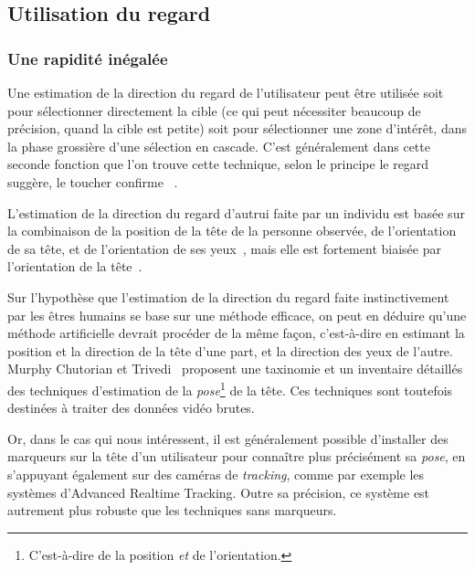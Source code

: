 	\subsection{Utilisation du regard}
	\subsubsection{Une rapidité inégalée}
	Une estimation de la direction du regard de l'utilisateur peut être utilisée soit pour sélectionner directement la cible (ce qui peut nécessiter beaucoup de précision, quand la cible est petite) soit pour sélectionner une zone d'intérêt, dans la phase grossière d'une sélection en cascade. C'est généralement dans cette seconde fonction que l'on trouve cette technique, selon le principe \og le regard suggère, le toucher confirme \fg{}~\cite{stellmach2012look}.

	L'estimation de la direction du regard d'autrui faite par un individu est basée sur la combinaison de la position de la tête de la personne observée, de l'orientation de sa tête, et de l'orientation de ses yeux~\cite{langton2004influence}, mais elle est fortement biaisée par l'orientation de la tête~\cite{wollaston1824apparent}.
	
	Sur l'hypothèse que l'estimation de la direction du regard faite instinctivement par les êtres humains se base sur une méthode efficace, on peut en déduire qu'une méthode artificielle devrait procéder de la même façon, c'est-à-dire en estimant la position et la direction de la tête d'une part, et la direction des yeux de l'autre. Murphy Chutorian et Trivedi~\cite{murphy2009head} proposent une taxinomie et un inventaire détaillés des techniques d'estimation de la \emph{pose}\footnote{C'est-à-dire de la position \emph{et} de l'orientation.} de la tête. Ces techniques sont toutefois destinées à traiter des données vidéo brutes.
	
	Or, dans le cas qui nous intéressent, il est généralement possible d'installer des marqueurs sur la tête d'un utilisateur pour connaître plus précisément sa \emph{pose}, en s'appuyant également sur des caméras de \emph{tracking}, comme par exemple les systèmes d'Advanced Realtime Tracking\footnotemark{}. Outre sa précision, ce système est autrement plus robuste que les techniques sans marqueurs.
	
	
